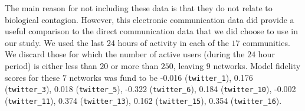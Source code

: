 \documentclass[twocolumn,8pt]{article}
\begin{document}
The main reason for not including these data is that they do not relate to biological contagion. However, this electronic communication data did provide a useful comparison to the direct communication data that we did choose to use in our study. We used the last 24 hours of activity in each of the $17$ communities. We discard those for which the number of active users (during the $24$ hour period) is either less than $20$ or more than $250$, leaving $9$ networks. Model fidelity scores for these $7$ networks was fund to be 
-0.016 (\verb|twitter_1|),
0.176 (\verb|twitter_3|),
0.018  (\verb|twitter_5|),
-0.322  (\verb|twitter_6|),
0.184 (\verb|twitter_10|),
-0.002  (\verb|twitter_11|),
0.374  (\verb|twitter_13|),
0.162 (\verb|twitter_15|),
0.354 (\verb|twitter_16|).

\end{document}
